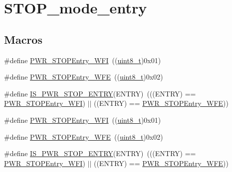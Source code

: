 \hypertarget{group___s_t_o_p__mode__entry}{}\section{S\+T\+O\+P\+\_\+mode\+\_\+entry}
\label{group___s_t_o_p__mode__entry}
\subsection*{Macros}
\begin{DoxyCompactItemize}
\item 
\#define \hyperlink{group___s_t_o_p__mode__entry_gaa1e1362f3d0b93e8f5f674e18cfc96c4}{P\+W\+R\+\_\+\+S\+T\+O\+P\+Entry\+\_\+\+W\+FI}~((\hyperlink{_p_e___types_8h_aba7bc1797add20fe3efdf37ced1182c5}{uint8\+\_\+t})0x01)
\item 
\#define \hyperlink{group___s_t_o_p__mode__entry_gaac98ac55fb8764121d4168d99c9b369e}{P\+W\+R\+\_\+\+S\+T\+O\+P\+Entry\+\_\+\+W\+FE}~((\hyperlink{_p_e___types_8h_aba7bc1797add20fe3efdf37ced1182c5}{uint8\+\_\+t})0x02)
\item 
\#define \hyperlink{group___s_t_o_p__mode__entry_ga4a94eb1f400dec6e486fbc229cbea8a0}{I\+S\+\_\+\+P\+W\+R\+\_\+\+S\+T\+O\+P\+\_\+\+E\+N\+T\+RY}(E\+N\+T\+RY)~(((E\+N\+T\+RY) == \hyperlink{openmotestm_2library_2inc_2stm32f10x__pwr_8h_aa1e1362f3d0b93e8f5f674e18cfc96c4}{P\+W\+R\+\_\+\+S\+T\+O\+P\+Entry\+\_\+\+W\+FI}) $\vert$$\vert$ ((E\+N\+T\+RY) == \hyperlink{openmotestm_2library_2inc_2stm32f10x__pwr_8h_aac98ac55fb8764121d4168d99c9b369e}{P\+W\+R\+\_\+\+S\+T\+O\+P\+Entry\+\_\+\+W\+FE}))
\item 
\#define \hyperlink{group___s_t_o_p__mode__entry_gaa1e1362f3d0b93e8f5f674e18cfc96c4}{P\+W\+R\+\_\+\+S\+T\+O\+P\+Entry\+\_\+\+W\+FI}~((\hyperlink{_p_e___types_8h_aba7bc1797add20fe3efdf37ced1182c5}{uint8\+\_\+t})0x01)
\item 
\#define \hyperlink{group___s_t_o_p__mode__entry_gaac98ac55fb8764121d4168d99c9b369e}{P\+W\+R\+\_\+\+S\+T\+O\+P\+Entry\+\_\+\+W\+FE}~((\hyperlink{_p_e___types_8h_aba7bc1797add20fe3efdf37ced1182c5}{uint8\+\_\+t})0x02)
\item 
\#define \hyperlink{group___s_t_o_p__mode__entry_ga4a94eb1f400dec6e486fbc229cbea8a0}{I\+S\+\_\+\+P\+W\+R\+\_\+\+S\+T\+O\+P\+\_\+\+E\+N\+T\+RY}(E\+N\+T\+RY)~(((E\+N\+T\+RY) == \hyperlink{openmotestm_2library_2inc_2stm32f10x__pwr_8h_aa1e1362f3d0b93e8f5f674e18cfc96c4}{P\+W\+R\+\_\+\+S\+T\+O\+P\+Entry\+\_\+\+W\+FI}) $\vert$$\vert$ ((E\+N\+T\+RY) == \hyperlink{openmotestm_2library_2inc_2stm32f10x__pwr_8h_aac98ac55fb8764121d4168d99c9b369e}{P\+W\+R\+\_\+\+S\+T\+O\+P\+Entry\+\_\+\+W\+FE}))
\end{DoxyCompactItemize}



